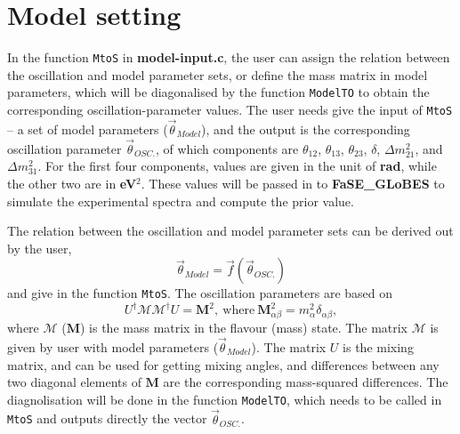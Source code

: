 \documentclass[aps,prd,nofootinbib,preprint]{revtex4}
\begin{document}
\section{Model setting}\label{sec:model_set}

In the function \texttt{MtoS} in \textbf{model-input.c}, the user can assign the relation between the oscillation and model parameter sets, or define the mass matrix in model parameters, which will be diagonalised by the function \texttt{ModelTO} to obtain the corresponding oscillation-parameter values.  The user needs give the input of \texttt{MtoS} -- a set of model parameters ($\vec{\theta}_{Model}$), and the output is the corresponding oscillation parameter $\vec{\theta}_{OSC.}$, of which components are $\theta_{12}$, $\theta_{13}$, $\theta_{23}$, $\delta$, $\Delta m_{21}^2$, and $\Delta m_{31}^2$. For the first four components, values are given in the unit of \textbf{rad}, while the other two are in \textbf{eV$^2$}. These values will be passed in to \textbf{FaSE\_GLoBES} to simulate 
the experimental spectra and compute the prior value.

The relation between the oscillation and model parameter sets can be derived out by the user, 
\begin{equation}
\vec{\theta}_{Model}=\vec{f}(\vec{\theta}_{OSC.})
\end{equation}
and give in the function \texttt{MtoS}.
%
The oscillation parameters are based on
\begin{equation}\label{eq:MM}
U^\dagger\mathcal{M}\mathcal{M}^\dagger U = \mathbf{M}^2,~\text{where}~\mathbf{M}^2_{\alpha\beta}=m_\alpha^2\delta_{\alpha\beta},
\end{equation}
where $\mathcal{M}$ ($\mathbf{M}$) is the mass matrix in the flavour (mass) state. The matrix $\mathcal{M}$ is given by user with model parameters ($\vec{\theta}_{Model}$). The matrix $U$ is the mixing matrix, and can be used for getting mixing angles, and differences between any two diagonal elements of $\textbf{M}$ are the corresponding mass-squared differences. The diagnolisation will be done in the function \texttt{ModelTO}, which needs to be called in \texttt{MtoS} and outputs directly the vector $\vec{\theta}_{OSC.}$.
\end{document}
